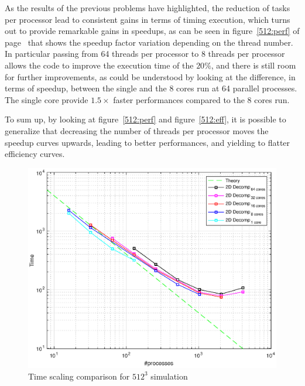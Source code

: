 \par
As the results of the previous problems have highlighted, the reduction of tasks per processor lead to consistent gains in terms of timing execution, which turns out to provide remarkable gains in speedups, as can be seen in figure~\ref{512:perf} of page~\pageref{512:perf} that shows the speedup factor variation depending on the thread number. In particular passing from 64 threads per processor to 8 threads per processor allows the code to improve the execution time of the $20\%$, and there is still room for further improvements, as could be understood by looking at the difference, in terms of speedup, between the single and the 8 cores run at 64 parallel processes. The single core provide $1.5\times$ faster performances compared to the 8 cores run. \\
\par
To sum up, by looking at figure~\ref{512:perf} and figure~\ref{512:eff}, it is possible to generalize that decreasing the number of threads per processor moves the speedup curves upwards, leading to better performances, and yielding to flatter efficiency curves.


\begin{figure}
\begin{center}
\includegraphics[scale=0.6]{grafici/5124}
\caption{Time scaling comparison for $512^3$ simulation}
\label{512:times}
\end{center}
\end{figure}

